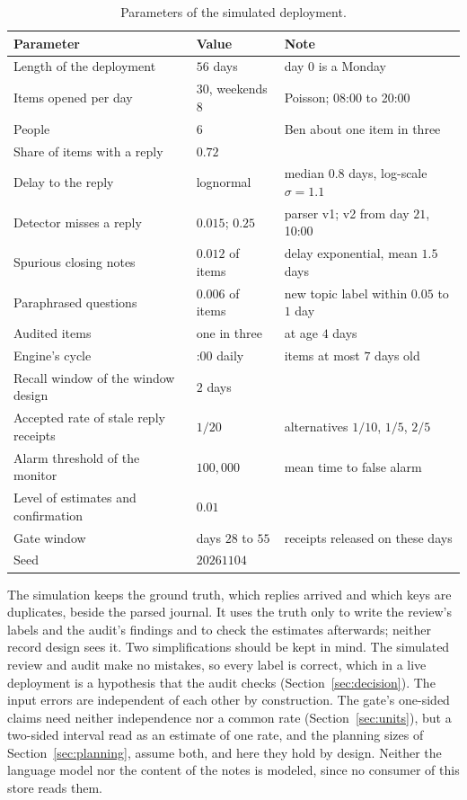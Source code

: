 \documentclass[11pt]{article}
\theoremstyle{definition}
\theoremstyle{plain}
\begin{document}
\begin{table}[ht]
\centering\small
\begin{tabularx}{\textwidth}{>{\raggedright\arraybackslash}p{5.6cm}>{\raggedright\arraybackslash}p{2.6cm}X}
\toprule
Parameter & Value & Note\\
\midrule
Length of the deployment & $56$ days & day $0$ is a Monday\\
Items opened per day & $30$, weekends $8$ & Poisson; 08:00 to 20:00\\
People & $6$ & Ben about one item in three\\
Share of items with a reply & $0.72$ & \\
Delay to the reply & lognormal & median $0.8$ days, log-scale $\sigma=1.1$\\
Detector misses a reply & $0.015$; $0.25$ & parser v1; v2 from day $21$, 10:00\\
Spurious closing notes & $0.012$ of items & delay exponential, mean $1.5$ days\\
Paraphrased questions & $0.006$ of items & new topic label within $0.05$ to $1$ day\\
Audited items & one in three & at age $4$ days\\
Engine's cycle & 09:00 daily & items at most $7$ days old\\
Recall window of the window design & $2$ days & \\
Accepted rate of stale reply receipts & $1/20$ & alternatives $1/10$, $1/5$, $2/5$\\
Alarm threshold of the monitor & $100{,}000$ & mean time to false alarm\\
Level of estimates and confirmation & $0.01$ & \\
Gate window & days $28$ to $55$ & receipts released on these days\\
Seed & $20261104$ & \\
\bottomrule
\end{tabularx}
\caption{Parameters of the simulated deployment.}\label{tab:params}
\end{table}

The simulation keeps the ground truth, which replies arrived and which keys are duplicates, beside
the parsed journal. It uses the truth only to write the review's labels and the audit's findings and
to check the estimates afterwards; neither record design sees it. Two simplifications should be kept
in mind. The simulated review and audit make no mistakes, so every label is correct, which in a live
deployment is a hypothesis that the audit checks (Section~\ref{sec:decision}). The input errors are
independent of each other by construction. The gate's one-sided claims need neither independence
nor a common rate (Section~\ref{sec:units}), but a two-sided interval read as an estimate of one
rate, and the planning sizes of Section~\ref{sec:planning}, assume both, and here they hold by
design. Neither the language model nor the content of the notes is modeled, since no consumer of
this store reads them.
\end{document}
